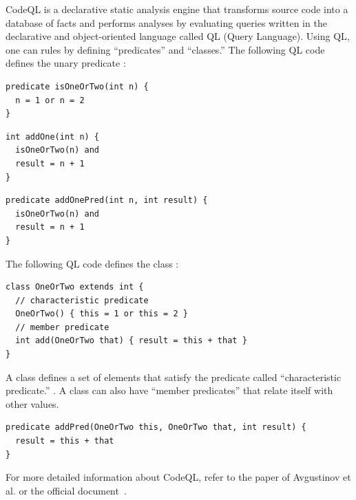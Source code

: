 CodeQL is a declarative static analysis engine that transforms source code into
a database of facts and performs analyses by evaluating queries written in the
declarative and object-oriented language called QL (Query Language). Using QL,
one can  rules by defining ``predicates'' and ``classes.'' The following
QL code defines the unary predicate :

\begin{lstlisting}[style=codeql,xleftmargin=2.5em]
predicate isOneOrTwo(int n) {
  n = 1 or n = 2
}
\end{lstlisting}
\noindent

\begin{lstlisting}[style=codeql,xleftmargin=2.5em]
int addOne(int n) {
  isOneOrTwo(n) and
  result = n + 1
}
\end{lstlisting}
\noindent

\begin{lstlisting}[style=codeql,xleftmargin=2.5em]
predicate addOnePred(int n, int result) {
  isOneOrTwo(n) and
  result = n + 1
}
\end{lstlisting}
\noindent
{}

The following QL code defines the class :
\begin{lstlisting}[style=codeql,xleftmargin=2.5em]
class OneOrTwo extends int {
  // characteristic predicate
  OneOrTwo() { this = 1 or this = 2 }
  // member predicate
  int add(OneOrTwo that) { result = this + that }
}
\end{lstlisting}

\noindent
A class defines a set of elements that satisfy the predicate called
``characteristic predicate.'' .
A class can also have ``member predicates''
that relate itself with other values.
\begin{lstlisting}[style=codeql,xleftmargin=2.5em]
predicate addPred(OneOrTwo this, OneOrTwo that, int result) {
  result = this + that
}
\end{lstlisting}
For more detailed information about CodeQL, refer to
the paper of Avgustinov et al.\cite{ql2016} or the official document~\cite{codeql}.

